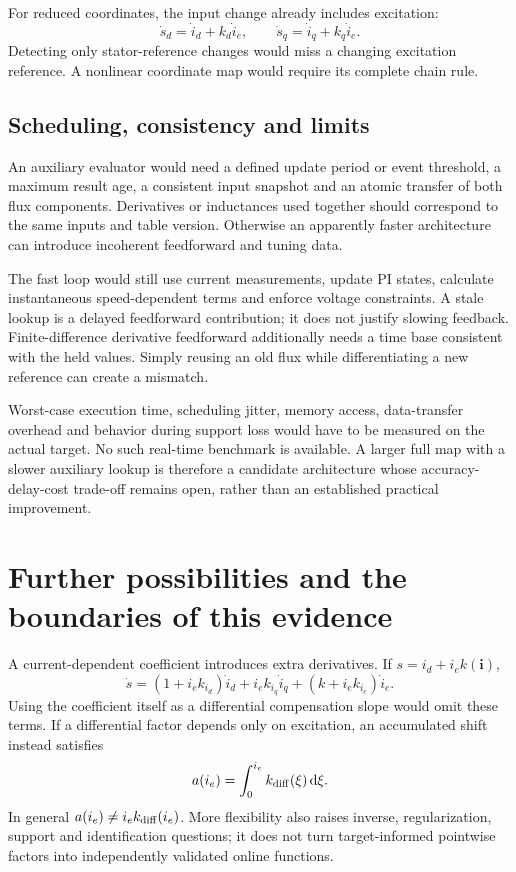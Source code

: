 For reduced coordinates, the input change already includes excitation:
\begin{equation}
\dot s_d=\dot i_d+k_d\dot i_e,\qquad
\dot s_q=\dot i_q+k_q\dot i_e.
\end{equation}
Detecting only stator-reference changes would miss a changing excitation reference. A nonlinear coordinate map would require its complete chain rule.

\subsection{Scheduling, consistency and limits}
An auxiliary evaluator would need a defined update period or event threshold, a maximum result age, a consistent input snapshot and an atomic transfer of both flux components. Derivatives or inductances used together should correspond to the same inputs and table version. Otherwise an apparently faster architecture can introduce incoherent feedforward and tuning data.

The fast loop would still use current measurements, update PI states, calculate instantaneous speed-dependent terms and enforce voltage constraints. A stale lookup is a delayed feedforward contribution; it does not justify slowing feedback. Finite-difference derivative feedforward additionally needs a time base consistent with the held values. Simply reusing an old flux while differentiating a new reference can create a mismatch.

Worst-case execution time, scheduling jitter, memory access, data-transfer overhead and behavior during support loss would have to be measured on the actual target. No such real-time benchmark is available. A larger full map with a slower auxiliary lookup is therefore a candidate architecture whose accuracy-delay-cost trade-off remains open, rather than an established practical improvement.

\section{Further possibilities and the boundaries of this evidence}
A current-dependent coefficient introduces extra derivatives. If $s=i_d+i_ek(\bm i)$,
\begin{equation}
\dot s=
(1+i_ek_{i_d})\dot i_d+
i_ek_{i_q}\dot i_q+
(k+i_ek_{i_e})\dot i_e.
\end{equation}
Using the coefficient itself as a differential compensation slope would omit these terms. If a differential factor depends only on excitation, an accumulated shift instead satisfies
\begin{equation}
a(i_e)=\int_0^{i_e}k_{\rm diff}(\xi)\,\mathrm d\xi.
\end{equation}
In general $a(i_e)\ne i_e k_{\rm diff}(i_e)$. More flexibility also raises inverse, regularization, support and identification questions; it does not turn target-informed pointwise factors into independently validated online functions.

